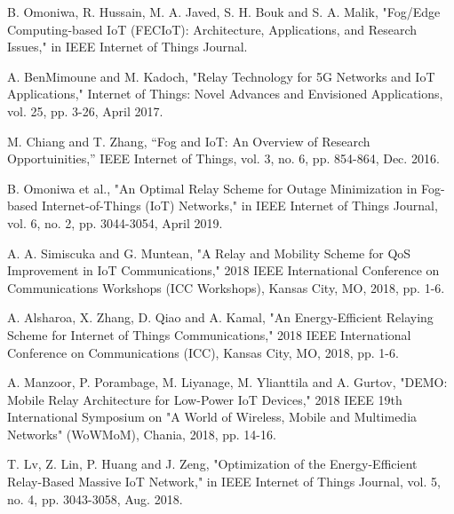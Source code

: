 \documentclass[journal]{IEEEtran}
\begin{document}
%
%
%
\begin{thebibliography}{1}
B. Omoniwa, R. Hussain, M. A. Javed, S. H. Bouk and S. A. Malik, "Fog/Edge Computing-based IoT (FECIoT): Architecture, Applications, and Research Issues," in IEEE Internet of Things Journal.

A. BenMimoune and M. Kadoch, "Relay Technology for 5G Networks and IoT Applications," Internet of Things: Novel Advances and Envisioned Applications, vol. 25, pp. 3-26, April 2017.

M. Chiang and T. Zhang, ``Fog and IoT: An Overview of Research Opportuinities,'' IEEE Internet of Things, vol. 3, no. 6, pp. 854-864, Dec.
2016.

B. Omoniwa et al., "An Optimal Relay Scheme for Outage Minimization in Fog-based Internet-of-Things (IoT) Networks," in IEEE Internet of Things Journal, vol. 6, no. 2, pp. 3044-3054, April 2019.

A. A. Simiscuka and G. Muntean, "A Relay and Mobility Scheme for QoS Improvement in IoT Communications," 2018 IEEE International Conference on Communications Workshops (ICC Workshops), Kansas City, MO, 2018, pp. 1-6.

A. Alsharoa, X. Zhang, D. Qiao and A. Kamal, "An Energy-Efficient Relaying Scheme for Internet of Things Communications," 2018 IEEE International Conference on Communications (ICC), Kansas City, MO, 2018, pp. 1-6.

A. Manzoor, P. Porambage, M. Liyanage, M. Ylianttila and A. Gurtov, "DEMO: Mobile Relay Architecture for Low-Power IoT Devices," 2018 IEEE 19th International Symposium on "A World of Wireless, Mobile and Multimedia Networks" (WoWMoM), Chania, 2018, pp. 14-16.

T. Lv, Z. Lin, P. Huang and J. Zeng, "Optimization of the Energy-Efficient Relay-Based Massive IoT Network," in IEEE Internet of Things Journal, vol. 5, no. 4, pp. 3043-3058, Aug. 2018.


\end{thebibliography}
\end{document}
